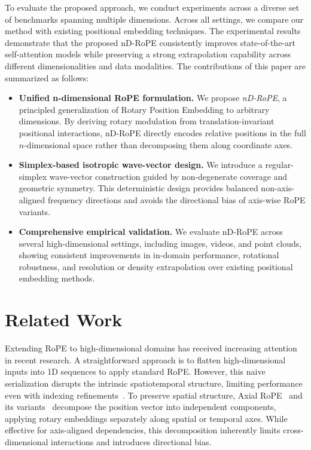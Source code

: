 \documentclass{article}
\theoremstyle{plain}
\theoremstyle{definition}
\theoremstyle{remark}
\begin{document}
To evaluate the proposed approach, we conduct experiments across a diverse set of benchmarks spanning multiple dimensions. Across all settings, we compare our method with existing positional embedding techniques. The experimental results demonstrate that the proposed nD-RoPE consistently improves state-of-the-art self-attention models while preserving a strong extrapolation capability across different dimensionalities and data modalities. The contributions of this paper are summarized as follows:
\begin{itemize}
    \item \textbf{Unified n-dimensional RoPE formulation.}
    We propose \emph{nD-RoPE}, a principled generalization of Rotary Position Embedding to arbitrary dimensions. By deriving rotary modulation from translation-invariant positional interactions, nD-RoPE directly encodes relative positions in the full $n$-dimensional space rather than decomposing them along coordinate axes.

    \item \textbf{Simplex-based isotropic wave-vector design.}
    We introduce a regular-simplex wave-vector construction guided by non-degenerate coverage and geometric symmetry. This deterministic design provides balanced non-axis-aligned frequency directions and avoids the directional bias of axis-wise RoPE variants.

    \item \textbf{Comprehensive empirical validation.}
    We evaluate nD-RoPE across several high-dimensional settings, including images, videos, and point clouds, showing consistent improvements in in-domain performance, rotational robustness, and resolution or density extrapolation over existing positional embedding methods.
\end{itemize}

\section{Related Work}
Extending RoPE to high-dimensional domains has received increasing attention in recent research. A straightforward approach is to flatten high-dimensional inputs into 1D sequences to apply standard RoPE. However, this naive serialization disrupts the intrinsic spatiotemporal structure, limiting performance even with indexing refinements~\cite{wang2024qwen2}. To preserve spatial structure, Axial RoPE~\cite{su2024roformer} and its variants~\cite{ma20253d,wei2025videorope} decompose the position vector into independent components, applying rotary embeddings separately along spatial or temporal axes. While effective for axis-aligned dependencies, this decomposition inherently limits cross-dimensional interactions and introduces directional bias.
\end{document}
